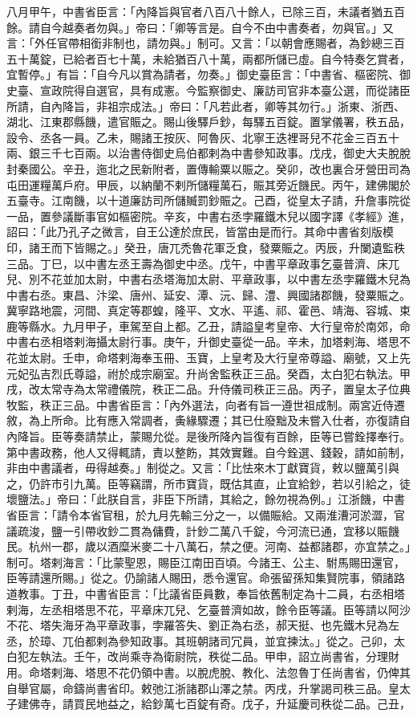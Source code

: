 \begin{pinyinscope}
 八月甲午，中書省臣言：「內降旨與官者八百八十餘人，已除三百，未議者猶五百餘。請自今越奏者勿與。」帝曰：「卿等言是。自今不由中書奏者，勿與官。」又言：「外任官帶相銜非制也，請勿與。」制可。又言：「以朝會應賜者，為鈔總三百五十萬錠，已給者百七十萬，未給猶百八十萬，兩都所儲已虛。自今特奏乞賞者，宜暫停。」有旨：「自今凡以賞為請者，勿奏。」御史臺臣言：「中書省、樞密院、御史臺、宣政院得自選官，具有成憲。今監察御史、廉訪司官非本臺公選，而從諸臣所請，自內降旨，非祖宗成法。」帝曰：「凡若此者，卿等其勿行。」浙東、浙西、湖北、江東郡縣饑，遣官賑之。賜山後驛戶鈔，每驛五百錠。置掌儀署，秩五品，設令、丞各一員。乙未，賜諸王按灰、阿魯灰、北寧王迭裡哥兒不花金三百五十兩、銀三千七百兩。以治書侍御史烏伯都剌為中書參知政事。戊戌，御史大夫脫脫封秦國公。辛丑，迤北之民新附者，置傳輸粟以賑之。癸卯，改也裏合牙營田司為屯田運糧萬戶府。甲辰，以納蘭不剌所儲糧萬石，賑其旁近饑民。丙午，建佛閣於五臺寺。江南饑，以十道廉訪司所儲贓罰鈔賑之。己酉，從皇太子請，升詹事院從一品，置參議斷事官如樞密院。辛亥，中書右丞孛羅鐵木兒以國字譯《孝經》進，詔曰：「此乃孔子之微言，自王公達於庶民，皆當由是而行。其命中書省刻版模印，諸王而下皆賜之。」癸丑，唐兀禿魯花軍乏食，發粟賑之。丙辰，升闌遺監秩三品。丁巳，以中書左丞王壽為御史中丞。戊午，中書平章政事乞臺普濟、床兀兒、別不花並加太尉，中書右丞塔海加太尉、平章政事，以中書左丞孛羅鐵木兒為中書右丞。東昌、汴梁、唐州、延安、潭、沅、歸、澧、興國諸郡饑，發粟賑之。冀寧路地震，河間、真定等郡蝗，隆平、文水、平遙、祁、霍邑、靖海、容城、束鹿等縣水。九月甲子，車駕至自上都。乙丑，請謚皇考皇帝、大行皇帝於南郊，命中書右丞相塔剌海攝太尉行事。庚午，升御史臺從一品。辛未，加塔剌海、塔思不花並太尉。壬申，命塔剌海奉玉冊、玉寶，上皇考及大行皇帝尊謚、廟號，又上先元妃弘吉烈氏尊謚，祔於成宗廟室。升尚舍監秩正三品。癸酉，太白犯右執法。甲戌，改太常寺為太常禮儀院，秩正二品。升侍儀司秩正三品。丙子，置皇太子位典牧監，秩正三品。中書省臣言：「內外選法，向者有旨一遵世祖成制。兩宮近侍遷敘，為上所命。比有應入常調者，夤緣驟遷；其已仕廢黜及未嘗入仕者，亦復請自內降旨。臣等奏請禁止，蒙賜允從。是後所降內旨復有百餘，臣等已嘗銓擇奉行。第中書政務，他人又得輒請，責以整飭，其效實難。自今銓選、錢穀，請如前制，非由中書議者，毋得越奏。」制從之。又言：「比怯來木丁獻寶貨，敕以鹽萬引與之，仍許市引九萬。臣等竊謂，所市寶貨，既估其直，止宜給鈔，若以引給之，徒壞鹽法。」帝曰：「此朕自言，非臣下所請，其給之，餘勿視為例。」江浙饑，中書省臣言：「請令本省官租，於九月先輸三分之一，以備賑給。又兩淮漕河淤澀，官議疏浚，鹽一引帶收鈔二貫為傭費，計鈔二萬八千錠，今河流已通，宜移以賑饑民。杭州一郡，歲以酒糜米麥二十八萬石，禁之便。河南、益都諸郡，亦宜禁之。」制可。塔剌海言：「比蒙聖恩，賜臣江南田百頃。今諸王、公主、駙馬賜田還官，臣等請還所賜。」從之。仍諭諸人賜田，悉令還官。命張留孫知集賢院事，領諸路道教事。丁丑，中書省臣言：「比議省臣員數，奉旨依舊制定為十二員，右丞相塔剌海，左丞相塔思不花，平章床兀兒、乞臺普濟如故，餘令臣等議。臣等請以阿沙不花、塔失海牙為平章政事，孛羅答失、劉正為右丞，郝天挺、也先鐵木兒為左丞，於璋、兀伯都剌為參知政事。其班朝諸司冗員，並宜揀汰。」從之。己卯，太白犯左執法。壬午，改尚乘寺為衛尉院，秩從二品。甲申，詔立尚書省，分理財用。命塔剌海、塔思不花仍領中書。以脫虎脫、教化、法忽魯丁任尚書省，仍俾其自舉官屬，命鑄尚書省印。敕弛江浙諸郡山澤之禁。丙戌，升掌謁司秩三品。皇太子建佛寺，請買民地益之，給鈔萬七百錠有奇。戊子，升延慶司秩從二品。己丑，
\end{pinyinscope}
